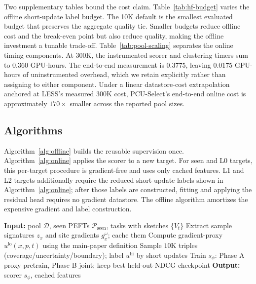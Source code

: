 Two supplementary tables bound the cost claim. Table~\ref{tab:hf-budget} varies
the offline short-update label budget. The 10K default is the smallest evaluated
budget that preserves the aggregate quality tie. Smaller budgets reduce offline
cost and the break-even point but also reduce quality, making the offline
investment a tunable trade-off. Table~\ref{tab:pool-scaling} separates the online
timing components. At 300K, the instrumented scorer and clustering timers sum to
0.360 GPU-hours. The end-to-end measurement is 0.3775, leaving 0.0175 GPU-hours
of uninstrumented overhead, which we retain explicitly rather than assigning to
either component. Under a linear datastore-cost extrapolation anchored at
LESS's measured 300K cost, PCU-Select's end-to-end online cost is approximately
$170\times$ smaller across the reported pool sizes.





\subsection{Algorithms}
\label{sec:appendix-algorithms}

Algorithm~\ref{alg:offline} builds the reusable supervision once.
Algorithm~\ref{alg:online} applies the scorer to a new target. For seen and L0
targets, this per-target procedure is gradient-free and uses only cached
features. L1 and L2 targets additionally require the reduced short-update labels
shown in Algorithm~\ref{alg:online}; after those labels are constructed, fitting
and applying the residual head requires no gradient datastore. The offline
algorithm amortizes the expensive gradient and label construction.

\begin{algorithm}[t]
\caption{Offline supervision (run once)}
\label{alg:offline}
\begin{algorithmic}[1]
\STATE \textbf{Input:} pool $\mathcal{D}$, seen PEFTs $\mathcal{P}_{\text{seen}}$, tasks with sketches $\{V_t\}$
\STATE Extract sample signatures $z_x$ and site gradients $g_x^\omega$; cache them 
  \STATE Compute gradient-proxy $u^{\mathrm{lo}}(x,p,t)$ using the main-paper definition
\ENDFOR
\STATE Sample $10$K triples (coverage/uncertainty/boundary); label $u^{\mathrm{hi}}$ by short updates
\STATE Train $s_\phi$: Phase A proxy pretrain, Phase B joint; keep best held-out-NDCG checkpoint
\STATE \textbf{Output:} scorer $s_\phi$, cached features
\end{algorithmic}
\end{algorithm}

